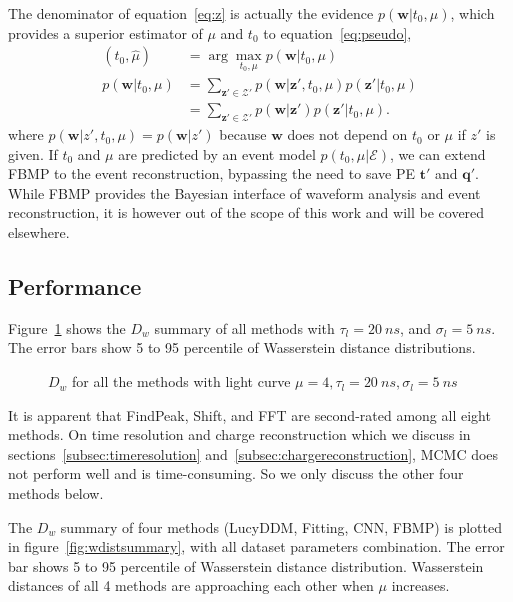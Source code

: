 The denominator of equation~\eqref{eq:z} is actually the evidence $p(\bm{w}|t_0, \mu)$, which provides a superior estimator of $\mu$ and $t_0$ to equation~\eqref{eq:pseudo},
\begin{equation}
\begin{aligned}
    \label{eq:bayesianinter}
    \left(\hat{t}_0, \hat{\mu}\right) &= \arg\underset{t_0,\mu}{\max} p(\bm{w} | t_0, \mu) \\
    p(\bm{w}|t_0, \mu) &= \sum_{\bm{z}'\in\mathcal{Z}'}p(\bm{w}|\bm{z}',t_0,\mu)p(\bm{z}'|t_0,\mu) \\
    &= \sum_{\bm{z}'\in\mathcal{Z}'}p(\bm{w}|\bm{z}')p(\bm{z}'|t_0,\mu).
\end{aligned}
\end{equation}
where $p(\bm{w}|z', t_0, \mu) = p(\bm{w}|z')$ because $\bm{w}$ does not depend on $t_0$ or $\mu$ if $z'$ is given. If $t_0$ and $\mu$ are predicted by an event model $p(t_0, \mu | \mathcal{E})$, we can extend FBMP to the event reconstruction, bypassing the need to save PE $\bm{t}'$ and $\bm{q}'$. While FBMP provides the Bayesian interface of waveform analysis and event reconstruction, it is however out of the scope of this work and will be covered elsewhere. 

\subsection{Performance}


Figure~\ref{fig:chargesummary} shows the $D_w$ summary of all methods with $\tau_l=\SI{20}{ns}$, and $\sigma_l=\SI{5}{ns}$. The error bars show 5 to 95 percentile of Wasserstein distance distributions. 

\begin{figure}[H]
    \centering
    \resizebox{\textwidth}{!}{}
    \caption{\label{fig:chargesummary} $D_w$ for all the methods with light curve $\mu=4, \tau_l=\SI{20}{ns}, \sigma_l=\SI{5}{ns}$}
\end{figure}

It is apparent that FindPeak, Shift, and FFT are second-rated among all eight methods. On time resolution and charge reconstruction which we discuss in sections~\ref{subsec:timeresolution} and~\ref{subsec:chargereconstruction}, MCMC does not perform well and is time-consuming. So we only discuss the other four methods below. 


The $D_w$ summary of four methods (LucyDDM, Fitting, CNN, FBMP) is plotted in figure~\ref{fig:wdistsummary}, with all dataset parameters combination. The error bar shows 5 to 95 percentile of Wasserstein distance distribution. Wasserstein distances of all 4 methods are approaching each other when $\mu$ increases. 

